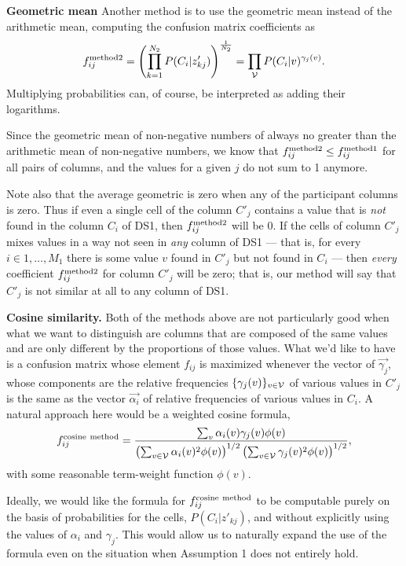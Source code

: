 \documentclass[12pt]{article}
\begin{document}
{\bf Geometric  mean}
Another method is to use the geometric mean instead of the arithmetic
mean, computing the confusion matrix coefficients as 
\begin{equation}
\label{eq:ag-geo}
f_{ij}^{\rm method 2} = 
 \left(\prod_{k=1}^{N_2} P(C_i|z'_{kj})\right)^{ \frac{1}{N_2}}=
\prod_{\cal{V}}  P(C_i|v)^{\gamma_j(v)}.
\end{equation}
Multiplying probabilities can, of course, be interpreted as adding their logarithms.

Since the geometric mean of non-negative numbers of always no greater than the arithmetic mean of non-negative numbers, we know that $f_{ij}^{\rm method 2} \le f_{ij}^{\rm method 1}$ for all pairs of columns, and the values for a given $j$ do not sum to 1 anymore.

Note also that the average geometric is zero when any of the
participant columns is zero. Thus if even a single cell of the column
$C'_j$ contains a value that is {\em not} found in the column $C_i$ of
DS1, then $f_{ij}^{\rm method 2}$ will be 0. If the cells of column
$C'_j$ mixes values in a way not seen in {\em any} column of DS1 ---
that is, for every $i \in {1, \ldots, M_1}$ there is some value $v$
found in $C'_j$ but not found in $C_i$ --- then {\em every} coefficient 
$f_{ij}^{\rm method 2}$ for column $C'_j$ will be zero; that is, our method will say that $C'_j$ is not similar at all to any column of DS1.

{\bf Cosine similarity.}  Both of the methods above are not
particularly good when what we want to distinguish are columns that
are composed of the same values and are only different by the
proportions of those values. What we'd like to have is a confusion
matrix whose element $f_{ij}$ is maximized whenever the vector of
$\vec{\gamma_j}$, whose components are the relative frequencies
$\{\gamma_j(v)\}_{v\in \cal{V}}$ of various values in $C'_j$ is the
same as the vector $\vec{\alpha_i}$ of relative frequencies of various
values in $C_i$. A natural approach here would be a weighted cosine formula,
$$
f_{ij}^{\rm cosine \ method} = \frac{\sum_v{ \alpha_i(v) \gamma_j(v) \phi(v)}}{
\left(\sum_{v\in \cal{V}}{\alpha_i(v)^2  \phi(v)}\right)^{1/2}
\left(\sum_{v\in \cal{V}}{\gamma_j(v)^2  \phi(v)}\right)^{1/2}
},
$$
with some reasonable term-weight function $\phi(v)$.

Ideally, we would like the formula for $f_{ij}^{\rm cosine \ method}$
to be computable purely on the basis of probabilities for the cells,
$P(C_i|z'_{kj})$, and without explicitly using the values of
$\alpha_i$ and $\gamma_j$. This would allow us to naturally expand the
use of the formula even on the situation when Assumption 1 does not
entirely hold.
\end{document}
